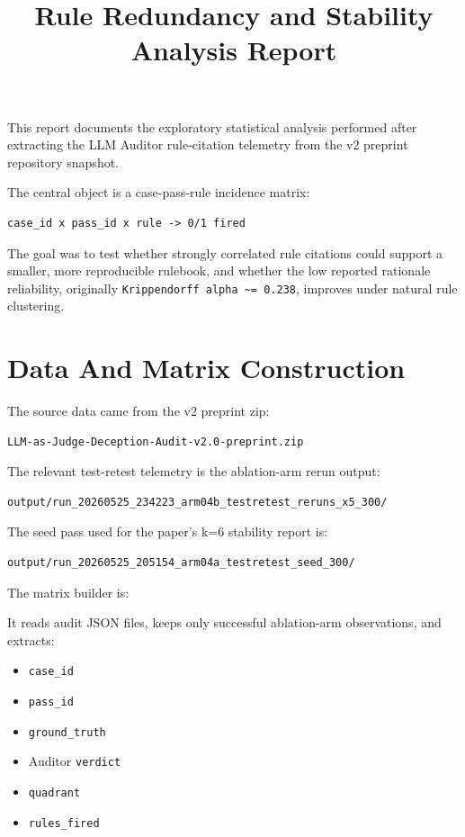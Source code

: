 \documentclass[11pt]{article}
\title{Rule Redundancy and Stability Analysis Report}
\date{}
\begin{document}
\maketitle

This report documents the exploratory statistical analysis performed after extracting the LLM Auditor rule-citation telemetry from the v2 preprint repository snapshot.

The central object is a case-pass-rule incidence matrix:

\begin{verbatim}
case_id x pass_id x rule -> 0/1 fired
\end{verbatim}

The goal was to test whether strongly correlated rule citations could support a smaller, more reproducible rulebook, and whether the low reported rationale reliability, originally \texttt{Krippendorff alpha \textasciitilde= 0.238}, improves under natural rule clustering.

\section*{Data And Matrix Construction}

The source data came from the v2 preprint zip:

\begin{verbatim}
LLM-as-Judge-Deception-Audit-v2.0-preprint.zip
\end{verbatim}

The relevant test-retest telemetry is the ablation-arm rerun output:

\begin{verbatim}
output/run_20260525_234223_arm04b_testretest_reruns_x5_300/
\end{verbatim}

The seed pass used for the paper's k=6 stability report is:

\begin{verbatim}
output/run_20260525_205154_arm04a_testretest_seed_300/
\end{verbatim}

The matrix builder is:

\href{../scripts/analyze_rule_incidence.py}{}

It reads audit JSON files, keeps only successful ablation-arm observations, and extracts:

\begin{itemize}[leftmargin=1.5em]
  \item \texttt{case\_id}
  \item \texttt{pass\_id}
  \item \texttt{ground\_truth}
  \item Auditor \texttt{verdict}
  \item \texttt{quadrant}
  \item \texttt{rules\_fired}
\end{itemize}
\end{document}
